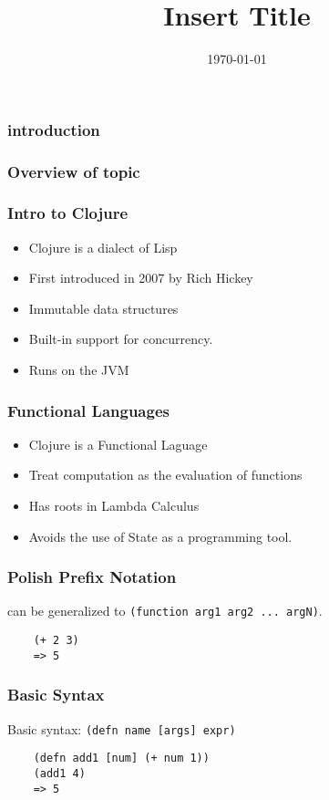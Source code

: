 \documentclass{beamer}
\newcommand{\clocode}[1]{{\texttt {#1}}}
\begin{document}
\title{Insert Title}
\date{\today}


\begin{frame}[fragile]
	\frametitle{introduction}

\end{frame}

\begin{frame}[fragile]
\frametitle{Overview of topic}
\end{frame}

\begin{frame}[fragile]
\frametitle{Intro to Clojure}
	\begin{itemize}
  	 \item Clojure is a dialect of Lisp
  	 \item First introduced in 2007 by Rich Hickey
  	 \item Immutable data structures
	 \item Built-in support for concurrency.
	 \item Runs on the JVM
	\end{itemize}
\end{frame}

\begin{frame}[fragile]
\frametitle{Functional Languages}
	\begin{itemize}
	 \item Clojure is a Functional Laguage
  	 \item Treat computation as the evaluation of functions
  	 \item Has roots in Lambda Calculus
  	 \item Avoids the use of State as a programming tool.
       \end{itemize}
\end{frame}

\begin{frame}[fragile]
\frametitle{Polish Prefix Notation}
can be generalized to \clocode{(function arg1 arg2 ... argN)}.
	\begin{verbatim}
	(+ 2 3)
	=> 5
	\end{verbatim}
\end{frame}

\begin{frame}[fragile]
\frametitle{Basic Syntax}
Basic syntax: \clocode{(defn name [args] expr)}
	\begin{verbatim}
	(defn add1 [num] (+ num 1))
	(add1 4)
	=> 5
	\end{verbatim}
\end{frame}
\end{document}
